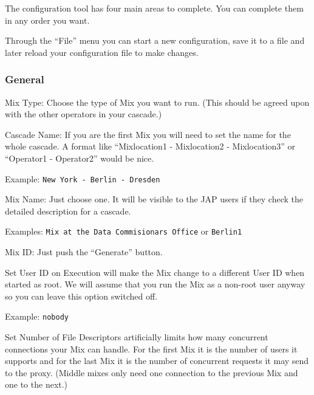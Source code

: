 \documentclass{article}
\begin{document}
The configuration tool has four main areas to complete.
You can complete them in any order you want.

Through the ``File'' menu you can start a new configuration, save it
to a file and later reload your configuration file to make changes.

\subsubsection{General}

\begin{description}

\item{Mix Type}: Choose the type of Mix you want to run. (This should be agreed upon
  with the other operators in your cascade.)

\item{Cascade Name}: If you are the first Mix you will need to set the name for the whole
  cascade.  A format like ``Mixlocation1 - Mixlocation2 - Mixlocation3''
  or ``Operator1 - Operator2'' would be nice. 
  
  Example: \verb|New York - Berlin - Dresden| 

\item{Mix Name}: Just choose one. It will be visible to the JAP users
  if they check the detailed description for a cascade.
  
  Examples: \verb|Mix at the Data Commisionars Office| or \verb|Berlin1|

\item{Mix ID}: Just push the ``Generate'' button.
  
\item{Set User ID on Execution} will make the Mix change to a
  different User ID when started as root. We will assume that you run
  the Mix as a non-root user anyway so you can leave this option
  switched off.

  Example: \texttt{nobody}
  
\item{Set Number of File Descriptors} artificially limits how many
  concurrent connections your Mix can handle. For the first Mix it is
  the number of users it supports and for the last Mix it is the
  number of concurrent requests it may send to the proxy. (Middle
  mixes only need one connection to the previous Mix and one to the
  next.)
  
\end{description}
\end{document}

